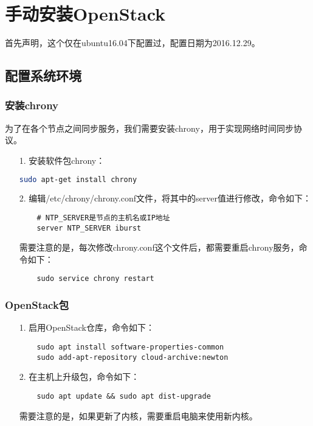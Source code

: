 \documentclass[a4paper,left=2.5cm,right=2.5cm,11pt]{article}
\begin{document}

\clearpage

\section{手动安装OpenStack}
	首先声明，这个仅在ubuntu16.04下配置过，配置日期为2016.12.29。\par

\subsection{配置系统环境}
\subsubsection{安装chrony}
	为了在各个节点之间同步服务，我们需要安装chrony，用于实现网络时间同步协议。
	\begin{itemize}
		\item[1.] 安装软件包chrony：
		\begin{lstlisting}[language = bash]
	sudo apt-get install chrony
		\end{lstlisting}

		\item[2.] 编辑/etc/chrony/chrony.conf文件，将其中的server值进行修改，命令如下：
		\begin{lstlisting}
	# NTP_SERVER是节点的主机名或IP地址
	server NTP_SERVER iburst
		\end{lstlisting}

		需要注意的是，每次修改chrony.conf这个文件后，都需要重启chrony服务，命令如下：
		\begin{lstlisting}
	sudo service chrony restart
		\end{lstlisting}
	\end{itemize}

\subsubsection{OpenStack包}
	\begin{itemize}
		\item[1.] 启用OpenStack仓库，命令如下：
		\begin{lstlisting}
	sudo apt install software-properties-common
	sudo add-apt-repository cloud-archive:newton
		\end{lstlisting}

		\item[2.] 在主机上升级包，命令如下：
		\begin{lstlisting}
	sudo apt update && sudo apt dist-upgrade
		\end{lstlisting}

		需要注意的是，如果更新了内核，需要重启电脑来使用新内核。
	\end{itemize}
\end{document}
